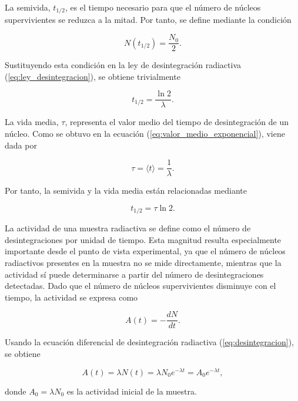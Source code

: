 \documentclass[12pt,a4paper]{article}
\begin{document}
La semivida, $t_{1/2}$, es el tiempo necesario para que el número de núcleos supervivientes se reduzca a la mitad. Por tanto, se define mediante la condición

\begin{equation}
    N(t_{1/2})=\frac{N_0}{2}.
\end{equation}

Sustituyendo esta condición en la ley de desintegración radiactiva (\ref{eq:ley_desintegracion}), se obtiene trivialmente

\begin{equation}
    t_{1/2}=\frac{\ln 2}{\lambda}.
    \label{eq:half_life}
\end{equation}

La vida media, $\tau$, representa el valor medio del tiempo de desintegración de un núcleo. Como se obtuvo en la ecuación (\ref{eq:valor_medio_exponencial}), viene dada por

\begin{equation}
    \tau=\langle t\rangle=\frac{1}{\lambda}.
    \label{eq:tiempo_medio_vida}
\end{equation}

Por tanto, la semivida y la vida media están relacionadas mediante

\begin{equation}
    t_{1/2}=\tau \ln 2.
\end{equation}

La actividad de una muestra radiactiva se define como el número de desintegraciones por unidad de tiempo. Esta magnitud resulta especialmente importante desde el punto de vista experimental, ya que el número de núcleos radiactivos presentes en la muestra no se mide directamente, mientras que la actividad sí puede determinarse a partir del número de desintegraciones detectadas. Dado que el número de núcleos supervivientes disminuye con el tiempo, la actividad se expresa como

\begin{equation}
    A(t)=-\frac{dN}{dt}.
\end{equation}

Usando la ecuación diferencial de desintegración radiactiva (\ref{eq:desintegracion}), se obtiene

\begin{equation}
    A(t)=\lambda N(t)=\lambda N_0 e^{-\lambda t}=A_0 e^{-\lambda t},
    \label{eq:actividad}
\end{equation}

donde $A_0=\lambda N_0$ es la actividad inicial de la muestra.
\end{document}
